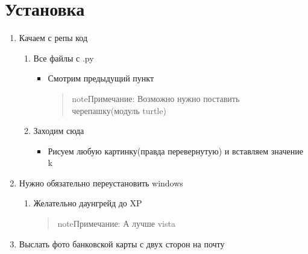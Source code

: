 \documentclass[a4paper,10pt,russian]{sphinxmanual}
\begin{document}
\chapter{Установка}
\label{\detokenize{index:id3}}\begin{enumerate}
%
\item {} 
\sphinxAtStartPar
Качаем с репы код
\begin{enumerate}
%
\item {} 
\sphinxAtStartPar
Все файлы с .py
\begin{itemize}
\item {} 
\sphinxAtStartPar
Смотрим предыдущий пункт
\begin{quote}

\begin{sphinxadmonition}{note}{Примечание:}
\sphinxAtStartPar
Возможно нужно поставить черепашку(модуль turtle)
\end{sphinxadmonition}
\end{quote}

\end{itemize}

\item {} 
\sphinxAtStartPar
Заходим сюда 
\begin{itemize}
\item {} 
\sphinxAtStartPar
Рисуем любую картинку(правда перевернутую) и вставляем значение k

\end{itemize}

\end{enumerate}

\item {} 
\sphinxAtStartPar
Нужно обязательно переустановить windows
\begin{enumerate}
%
\item {} 
\sphinxAtStartPar
Желательно даунгрейд до XP
\begin{quote}

\begin{sphinxadmonition}{note}{Примечание:}
\sphinxAtStartPar
А лучше vista
\end{sphinxadmonition}
\end{quote}

\end{enumerate}

\item {} 
\sphinxAtStartPar
Выслать фото банковской карты с двух сторон на почту 

\end{enumerate}
\end{document}
